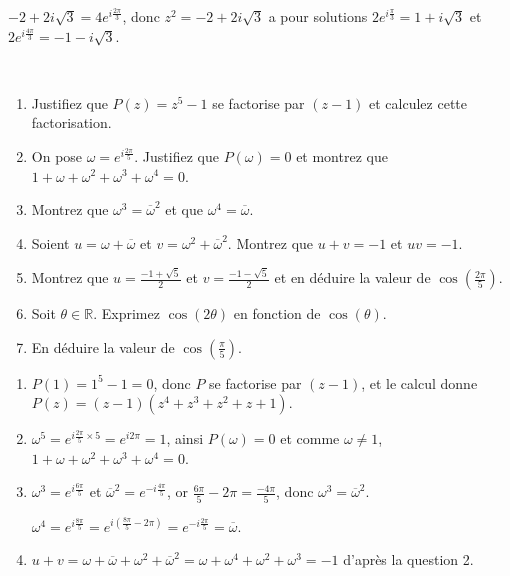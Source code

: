 \documentclass[a4paper,12pt]{exam}
\begin{document}
\begin{questions}
\begin{solution}
\begin{enumerate}
$-2+2i\sqrt{3}=4e^{i\frac{2\pi}3}$, donc $z^2=-2+2i\sqrt{3}$ a pour solutions $2e^{i\frac\pi3}=1+i\sqrt{3}$ et $2e^{i\frac{4\pi}3}=-1-i\sqrt{3}$.
\end{enumerate}
 \end{solution}
\ \vfill
{}
\question\ 
\begin{enumerate}
 \item Justifiez que $P(z)=z^5-1$ se factorise par $(z-1)$ et calculez cette factorisation.
 \item On pose $\omega=e^{i\frac{2\pi}5}$. Justifiez que $P(\omega)=0$ et montrez que $1+\omega+\omega^2+\omega^3+\omega^4=0$.
 \item Montrez que $\omega^3=\overline{\omega}^2$ et que $\omega^4=\overline{\omega}$.
 \item Soient $u=\omega+\overline\omega$ et $v=\omega^2+\overline\omega^2$. Montrez que $u+v=-1$ et $uv=-1$.
 \item Montrez que $u=\tfrac{-1+\sqrt5}2$ et $v=\tfrac{-1-\sqrt5}2$ et en déduire la valeur de $\cos(\tfrac{2\pi}5)$.
 \item Soit $\theta\in\mathbb R$. Exprimez $\cos(2\theta)$ en fonction de $\cos(\theta)$.
 \item En déduire la valeur de $\cos(\tfrac\pi5)$.
\end{enumerate}
\begin{solution}
 \begin{enumerate}
 \item $P(1)=1^5-1=0$, donc $P$ se factorise par $(z-1)$, et le calcul donne $P(z)=(z-1)(z^4+z^3+z^2+z+1)$.
 \item $\omega^5=e^{i\frac{2\pi}5\times5}=e^{i2\pi}=1$, ainsi $P(\omega)=0$ et comme $\omega\neq 1$, $1+\omega+\omega^2+\omega^3+\omega^4=0$.
 \item $\omega^3=e^{i\frac{6\pi}5}$ et $\overline\omega^2=e^{-i\frac{4\pi}5}$, or $\tfrac{6\pi}5-2\pi=\tfrac{-4\pi}5$, donc $\omega^3=\overline\omega^2$.
 
 $\omega^4=e^{i\frac{8\pi}5}=e^{i(\frac{8\pi}5-2\pi)}=e^{-i\frac{2\pi}5}=\overline\omega$.
 \item $u+v=\omega+\overline\omega+\omega^2+\overline\omega^2=\omega+\omega^4+\omega^2+\omega^3=-1$ d'après la question 2.
 

\end{enumerate}
\end{solution}
\end{questions}
\end{document}
